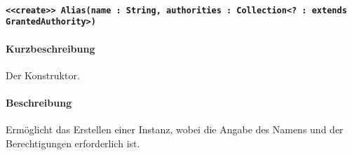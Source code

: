 \paragraph*{\texttt{<<create>> Alias(name : String, authorities : Collection<? : extends GrantedAuthority>)}}%
\paragraph*{Kurzbeschreibung}
Der Konstruktor.
\paragraph*{Beschreibung}
Ermöglicht das Erstellen einer Instanz, wobei die Angabe des Namens und der Berechtigungen erforderlich ist.
